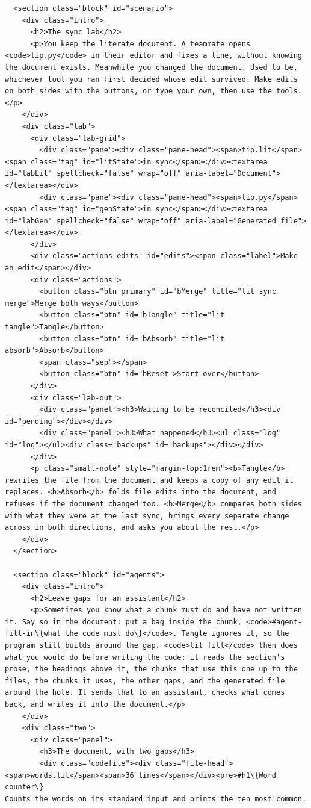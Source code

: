 \documentclass[10pt,a4paper]{article}
\newcounter{chunk}
\begin{document}
\begin{Verbatim}
  <section class="block" id="scenario">
    <div class="intro">
      <h2>The sync lab</h2>
      <p>You keep the literate document. A teammate opens <code>tip.py</code> in their editor and fixes a line, without knowing the document exists. Meanwhile you changed the document. Used to be, whichever tool you ran first decided whose edit survived. Make edits on both sides with the buttons, or type your own, then use the tools.</p>
    </div>
    <div class="lab">
      <div class="lab-grid">
        <div class="pane"><div class="pane-head"><span>tip.lit</span><span class="tag" id="litState">in sync</span></div><textarea id="labLit" spellcheck="false" wrap="off" aria-label="Document"></textarea></div>
        <div class="pane"><div class="pane-head"><span>tip.py</span><span class="tag" id="genState">in sync</span></div><textarea id="labGen" spellcheck="false" wrap="off" aria-label="Generated file"></textarea></div>
      </div>
      <div class="actions edits" id="edits"><span class="label">Make an edit</span></div>
      <div class="actions">
        <button class="btn primary" id="bMerge" title="lit sync merge">Merge both ways</button>
        <button class="btn" id="bTangle" title="lit tangle">Tangle</button>
        <button class="btn" id="bAbsorb" title="lit absorb">Absorb</button>
        <span class="sep"></span>
        <button class="btn" id="bReset">Start over</button>
      </div>
      <div class="lab-out">
        <div class="panel"><h3>Waiting to be reconciled</h3><div id="pending"></div></div>
        <div class="panel"><h3>What happened</h3><ul class="log" id="log"></ul><div class="backups" id="backups"></div></div>
      </div>
      <p class="small-note" style="margin-top:1rem"><b>Tangle</b> rewrites the file from the document and keeps a copy of any edit it replaces. <b>Absorb</b> folds file edits into the document, and refuses if the document changed too. <b>Merge</b> compares both sides with what they were at the last sync, brings every separate change across in both directions, and asks you about the rest.</p>
    </div>
  </section>

  <section class="block" id="agents">
    <div class="intro">
      <h2>Leave gaps for an assistant</h2>
      <p>Sometimes you know what a chunk must do and have not written it. Say so in the document: put a bag inside the chunk, <code>#agent-fill-in\{what the code must do\}</code>. Tangle ignores it, so the program still builds around the gap. <code>lit fill</code> then does what you would do before writing the code: it reads the section's prose, the headings above it, the chunks that use this one up to the files, the chunks it uses, the other gaps, and the generated file around the hole. It sends that to an assistant, checks what comes back, and writes it into the document.</p>
    </div>
    <div class="two">
      <div class="panel">
        <h3>The document, with two gaps</h3>
        <div class="codefile"><div class="file-head"><span>words.lit</span><span>36 lines</span></div><pre>#h1\{Word counter\}
Counts the words on its standard input and prints the ten most common.


\end{Verbatim}
\end{document}
